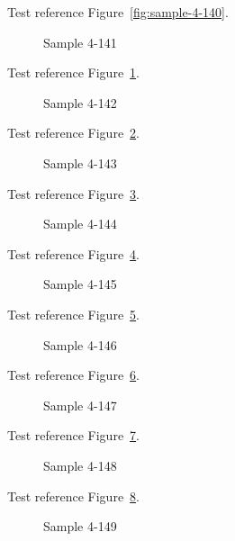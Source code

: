 Test reference Figure~\ref{fig:sample-4-140}.

\begin{figure}[tbhp]
\caption{Sample 4-141}
\label{fig:sample-4-141}
\end{figure}

Test reference Figure~\ref{fig:sample-4-141}.

\begin{figure}[tbhp]
\caption{Sample 4-142}
\label{fig:sample-4-142}
\end{figure}

Test reference Figure~\ref{fig:sample-4-142}.

\begin{figure}[tbhp]
\caption{Sample 4-143}
\label{fig:sample-4-143}
\end{figure}

Test reference Figure~\ref{fig:sample-4-143}.

\begin{figure}[tbhp]
\caption{Sample 4-144}
\label{fig:sample-4-144}
\end{figure}

Test reference Figure~\ref{fig:sample-4-144}.

\begin{figure}[tbhp]
\caption{Sample 4-145}
\label{fig:sample-4-145}
\end{figure}

Test reference Figure~\ref{fig:sample-4-145}.

\begin{figure}[tbhp]
\caption{Sample 4-146}
\label{fig:sample-4-146}
\end{figure}

Test reference Figure~\ref{fig:sample-4-146}.

\begin{figure}[tbhp]
\caption{Sample 4-147}
\label{fig:sample-4-147}
\end{figure}

Test reference Figure~\ref{fig:sample-4-147}.

\begin{figure}[tbhp]
\caption{Sample 4-148}
\label{fig:sample-4-148}
\end{figure}

Test reference Figure~\ref{fig:sample-4-148}.

\begin{figure}[tbhp]
\caption{Sample 4-149}
\label{fig:sample-4-149}
\end{figure}

